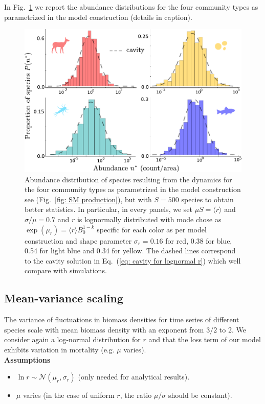 \documentclass[10pt]{article}
\begin{document}
In Fig.~\ref{fig: SM species abundance realistic} we report the abundance distributions
for the four community types as parametrized in the model construction (details in caption).

\begin{figure}[h!]
    \centering
    \includegraphics[width=.8\textwidth]{fig/SM-abundance-realistic2.pdf}
    \caption{Abundance distribution of species resulting from the dynamics
    for the four community types as parametrized in the model 
    construction see (Fig.~\ref{fig: SM production}), but with $S=500$ species
    to obtain better statistics. In particular, in every panels, 
    we set $\mu S = \langle r \rangle $ and $\sigma/\mu=0.7 $ and $r$
    is lognormally distributed with mode chose as 
    $\exp(\mu_r)=\langle r \rangle B_0^{1-k}$ specific for each color
    as per model construction and shape parameter $\sigma_r = 0.16$
    for red, 0.38 for blue, 0.54 for light blue and 0.34 for yellow.
    The dashed lines correspond to the cavity solution 
    in Eq.~(\ref{eq: cavity for lognormal r}) 
    which well compare with simulations.}
    \label{fig: SM species abundance realistic}
\end{figure}

\subsection{Mean-variance scaling}
The variance of fluctuations in biomass densities for time series
of different species scale with mean biomass density with an exponent
from $3/2$ to 2.
We consider again a log-normal distribution for $r$
and that the loss term of our model exhibits variation in mortality
(e.g. $\mu$ varies).
\\

\textbf{Assumptions}
\begin{itemize}
    \item $\ln r\sim\mathcal{N} (\mu_r,\sigma_r)$ (only needed for analytical results).
    \item $\mu$ varies (in the case of uniform $r$, the ratio $\mu/\sigma$ should be constant).
\end{itemize}
\end{document}
